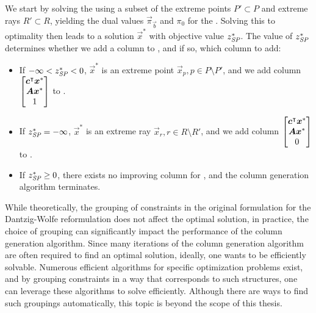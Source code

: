 We start by solving the \RMP{} using a subset of the extreme points $P' \subset P$ and extreme rays $R' \subset R$, yielding the dual values $\vec{\pi}_\vec{b}$ and $\pi_0$ for the \SP{}. Solving this \SP{} to optimality then leads to a solution $\vec{x}^*$ with objective value $z^*_\SP{}$. The value of $z^*_\SP{}$ determines whether we add a column to \RMP{}, and if so, which column to add:
\begin{itemize}
\item If $-\infty < z^*_\SP{} < 0$, $\vec{x}^*$ is an extreme point $\vec{x}_p, p \in P \setminus P'$, and we add column $\begin{bmatrix} {\bm{c}}^\intercal {\bm{x}}^* \\ {\bm{A}} {\bm{x}}^* \\ 1 \end{bmatrix}$ to \RMP{}.
\item If $z^*_\SP{} = -\infty$, $\vec{x}^*$ is an extreme ray $\vec{x}_r, r \in R \setminus R'$, and we add column $\begin{bmatrix} {\bm{c}}^\intercal {\bm{x}}^* \\ {\bm{A}} {\bm{x}}^* \\ 0 \end{bmatrix}$ to \RMP{}.
\item If $z^*_\SP{} \geq 0$, there exists no improving column for \RMP{}, and the column generation algorithm terminates.
\end{itemize}

While theoretically, the grouping of constraints in the original \LP{} formulation for the Dantzig-Wolfe reformulation does not affect the optimal solution, in practice, the choice of grouping can significantly impact the performance of the column generation algorithm. Since many iterations of the column generation algorithm are often required to find an optimal solution, ideally, one wants \SP{} to be efficiently solvable. Numerous efficient algorithms for specific optimization problems exist, and by grouping constraints in a way that \SP{} corresponds to such structures, one can leverage these algorithms to solve \SP{} efficiently. Although there are ways to find such groupings automatically, this topic is beyond the scope of this thesis.
